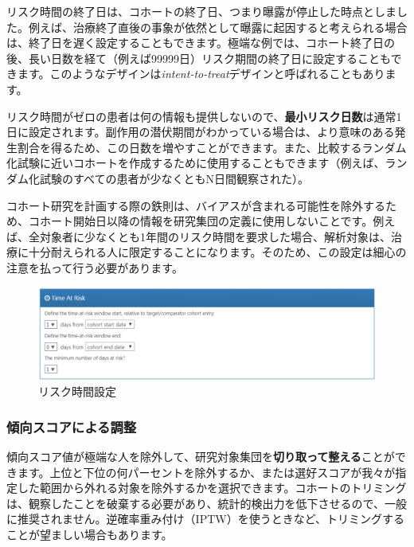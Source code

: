 \documentclass[
  11pt]{book}
\makeatletter
\newenvironment{kframe}{%
\medskip{}
\setlength{\fboxsep}{.8em}
 \def\at@end@of@kframe{}%
 \ifinner\ifhmode%
  \def\at@end@of@kframe{\end{minipage}}%
  \begin{minipage}{\columnwidth}%
 \fi\fi%
 \def\FrameCommand##1{\hskip\@totalleftmargin \hskip-\fboxsep
 \colorbox{myShadeColor}{##1}\hskip-\fboxsep
     \hskip-\linewidth \hskip-\@totalleftmargin \hskip\columnwidth}%
 \MakeFramed {\advance\hsize-\width
   \@totalleftmargin\z@ \linewidth\hsize
   \@setminipage}}%
 {\par\unskip\endMakeFramed%
 \at@end@of@kframe}
\newenvironment{rmdblock}[1]
  {
  \begin{itemize}
  \renewcommand{\labelitemi}{
    \raisebox{-.7\height}[0pt][0pt]{
      {\setkeys{Gin}{width=3em,keepaspectratio}\texttt{[image: images/\#1]}}
    }
  }
  \setlength{\fboxsep}{1em}
  \begin{kframe}
  \item
  }
  {
  \end{kframe}
  \end{itemize}
  }
\newenvironment{rmdimportant}
  {\begin{rmdblock}{important}}
  {\end{rmdblock}}
\theoremstyle{definition}
\theoremstyle{definition}
\theoremstyle{definition}
\theoremstyle{definition}
\theoremstyle{remark}
\makeatother
\begin{document}
リスク時間の終了日は、コホートの終了日、つまり曝露が停止した時点としました。例えば、治療終了直後の事象が依然として曝露に起因すると考えられる場合は、終了日を遅く設定することもできます。極端な例では、コホート終了日の後、長い日数を経て（例えば99999日）リスク期間の終了日に設定することもできます。このようなデザインは\emph{intent-to-treat}デザインと呼ばれることもあります。

リスク時間がゼロの患者は何の情報も提供しないので、\textbf{最小リスク日数}は通常1日に設定されます。副作用の潜伏期間がわかっている場合は、より意味のある発生割合を得るため、この日数を増やすことができます。また、比較するランダム化試験に近いコホートを作成するために使用することもできます（例えば、ランダム化試験のすべての患者が少なくともN日間観察された）。

\begin{rmdimportant}
コホート研究を計画する際の鉄則は、バイアスが含まれる可能性を除外するため、コホート開始日以降の情報を研究集団の定義に使用しないことです。例えば、全対象者に少なくとも1年間のリスク時間を要求した場合、解析対象は、治療に十分耐えられる人に限定することになります。そのため、この設定は細心の注意を払って行う必要があります。
\end{rmdimportant}

\begin{figure}

{\centering \includegraphics[width=1\linewidth]{images/PopulationLevelEstimation/timeAtRisk} 

}

\caption{リスク時間設定}\label{fig:timeAtRisk}
\end{figure}

\subsubsection*{傾向スコアによる調整}\label{ux50beux5411ux30b9ux30b3ux30a2ux306bux3088ux308bux8abfux6574}

傾向スコア値が極端な人を除外して、研究対象集団を\textbf{切り取って整える}ことができます。上位と下位の何パーセントを除外するか、または選好スコアが我々が指定した範囲から外れる対象を除外するかを選択できます。コホートのトリミングは、観察したことを破棄する必要があり、統計的検出力を低下させるので、一般に推奨されません。逆確率重み付け（IPTW）を使うときなど、トリミングすることが望ましい場合もあります。
\end{document}
